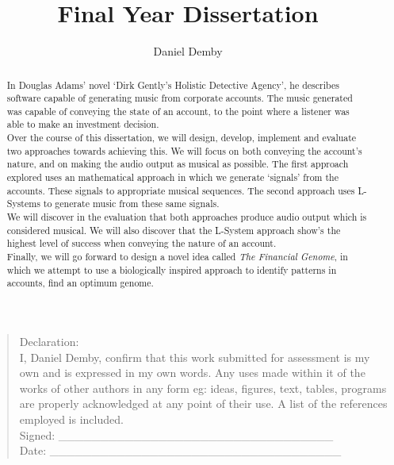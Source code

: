 \documentclass[a4paper,11pt]{report}
\author{Daniel Demby}
\title{Final Year Dissertation}
\begin{document}

\thispagestyle{empty}
\begin{quote}
Declaration: \\

I, Daniel Demby, confirm that this work submitted for assessment is my own and is expressed in my own words. Any uses made within it of the works of other authors in any form eg: ideas, figures, text, tables, programs are properly acknowledged at any point of their use. A list of the references employed is included. \\

Signed: \_\_\_\_\_\_\_\_\_\_\_\_\_\_\_\_\_\_\_\_\_\_\_\_\_\_\_\_\_\_\_\_\_ \\

Date: \_\_\_\_\_\_\_\_\_\_\_\_\_\_\_\_\_\_\_\_\_\_\_\_\_\_\_\_\_\_\_\_\_\_\_ \\
\end{quote}
\begin{abstract}
\thispagestyle{empty}

\noindent In Douglas Adams' novel `Dirk Gently's Holistic Detective Agency', he describes software capable of generating music from corporate accounts. The music generated was capable of conveying the state of an account, to the point where a listener was able to make an investment decision. \\

\noindent Over the course of this dissertation, we will design, develop, implement and evaluate two approaches towards achieving this. We will focus on both conveying the account's nature, and on making the audio output as musical as possible. The first approach explored uses an mathematical approach in which we generate `signals' from the accounts. These signals to appropriate musical sequences. The second approach uses L-Systems to generate music from these same signals. \\

\noindent We will discover in the evaluation that both approaches produce audio output which is considered musical. We will also discover that the L-System approach show's the highest level of success when conveying the nature of an account. \\

\noindent Finally, we will go forward to design a novel idea called \textit{The Financial Genome}, in which we attempt to use a biologically inspired approach to identify patterns in accounts, find an optimum genome.

\end{abstract}
\begin{singlespace}

\thispagestyle{empty}
\tableofcontents
\thispagestyle{empty}
\end{singlespace}
\end{document}

